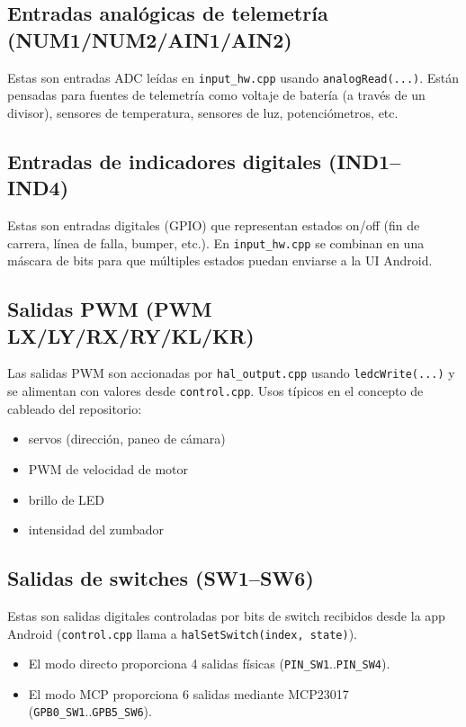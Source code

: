 \subsection{Entradas analógicas de telemetría (NUM1/NUM2/AIN1/AIN2)}
Estas son entradas ADC leídas en \texttt{input\_hw.cpp} usando \texttt{analogRead(...)}.
Están pensadas para fuentes de telemetría como voltaje de batería (a través de un divisor), sensores de temperatura, sensores de luz,
potenciómetros, etc.

\subsection{Entradas de indicadores digitales (IND1--IND4)}
Estas son entradas digitales (GPIO) que representan estados on/off (fin de carrera, línea de falla, bumper, etc.).
En \texttt{input\_hw.cpp} se combinan en una máscara de bits para que múltiples estados puedan enviarse a la UI Android.

\subsection{Salidas PWM (PWM LX/LY/RX/RY/KL/KR)}
Las salidas PWM son accionadas por \texttt{hal\_output.cpp} usando \texttt{ledcWrite(...)} y se alimentan con valores desde
\texttt{control.cpp}.
Usos típicos en el concepto de cableado del repositorio:
\begin{itemize}
    \item servos (dirección, paneo de cámara)
    \item PWM de velocidad de motor
    \item brillo de LED
    \item intensidad del zumbador
\end{itemize}

\subsection{Salidas de switches (SW1--SW6)}
Estas son salidas digitales controladas por bits de switch recibidos desde la app Android (\texttt{control.cpp} llama a
\texttt{halSetSwitch(index, state)}).
\begin{itemize}
    \item El modo directo proporciona 4 salidas físicas (\texttt{PIN\_SW1}..\texttt{PIN\_SW4}).
    \item El modo MCP proporciona 6 salidas mediante MCP23017 (\texttt{GPB0\_SW1}..\texttt{GPB5\_SW6}).
\end{itemize}

